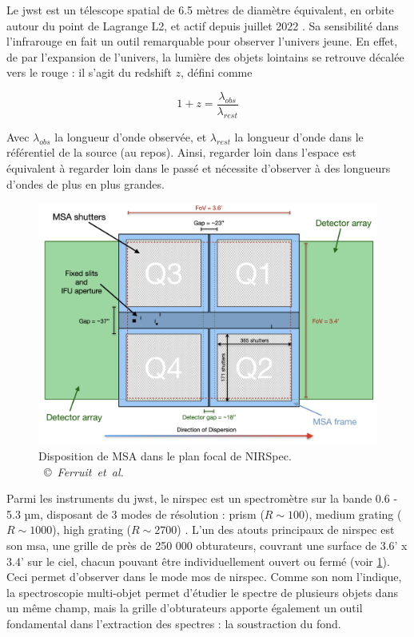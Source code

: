 \documentclass[11pt, a4paper]{article}
\newcommand{\customcite}[2]{\mbox{
  {\small \copyright} \textit{#1} \cite{#2}}
}
\begin{document}
Le \gls{jwst} est un télescope spatial de 6.5 mètres de diamètre équivalent, en orbite autour du point de Lagrange L2, et actif depuis juillet 2022 \cite{jwst_website}. Sa sensibilité dans l'infrarouge en fait un outil remarquable pour observer l'univers jeune. En effet, de par l'expansion de l'univers, la lumière des objets lointains se retrouve décalée vers le rouge : il s'agit du redshift $z$, défini comme 

\begin{equation}
    1 + z = \frac{\lambda_{obs}}{\lambda_{rest}}
\end{equation}

Avec $\lambda_{obs}$ la longueur d'onde observée, et $\lambda_{rest}$ la longueur d'onde dans le référentiel de la source (au repos). Ainsi, regarder loin dans l'espace est équivalent à regarder loin dans le passé et nécessite d'observer à des longueurs d'ondes de plus en plus grandes.

\begin{figure}[H]
  \centering
  \includegraphics[scale=0.4]{assets/msa_ds_new.png}
  \caption{Disposition de MSA dans le plan focal de NIRSpec. \customcite{Ferruit et al.}{2022A&A...661A..81F}}
  \label{fig:msa_shutter}
\end{figure}

Parmi les instruments du \gls{jwst}, le \gls{nirspec} est un spectromètre sur la bande 0.6 - 5.3  µm, disposant de 3 modes de résolution : prism ($R \sim 100$), medium grating ($R \sim 1000$), high grating ($R \sim 2700$) \cite{nirspec}. L'un des atouts principaux de \gls{nirspec} est son \gls{msa}, une grille de près de 250 000 obturateurs, couvrant une surface de 3.6' x 3.4' sur le ciel, chacun pouvant être individuellement ouvert ou fermé \cite{msa} (voir \ref{fig:msa_shutter}). Ceci permet d'observer dans le mode \gls{mos} de \gls{nirspec}. Comme son nom l'indique, la spectroscopie multi-objet permet d'étudier le spectre de plusieurs objets dans un même champ, mais la grille d'obturateurs apporte également un outil fondamental dans l'extraction des spectres : la soustraction du fond.
\end{document}
